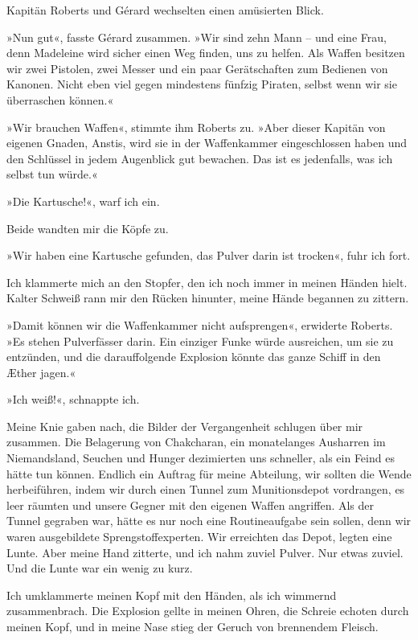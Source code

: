 Kapitän Roberts und Gérard wechselten einen amüsierten Blick.

»Nun gut«, fasste Gérard zusammen. »Wir sind zehn Mann – und eine
Frau, denn Madeleine wird sicher einen Weg finden, uns zu helfen.
Als Waffen besitzen wir zwei Pistolen, zwei Messer und ein paar
Gerätschaften zum Bedienen von Kanonen. Nicht eben viel gegen
mindestens fünfzig Piraten, selbst wenn wir sie überraschen
können.«

»Wir brauchen Waffen«, stimmte ihm Roberts zu. »Aber dieser Kapitän
von eigenen Gnaden, Anstis, wird sie in der Waffenkammer
eingeschlossen haben und den Schlüssel in jedem Augenblick gut
bewachen. Das ist es jedenfalls, was ich selbst tun würde.«

»Die Kartusche!«, warf ich ein.

Beide wandten mir die Köpfe zu.

»Wir haben eine Kartusche gefunden, das Pulver darin ist trocken«,
fuhr ich fort.

Ich klammerte mich an den Stopfer, den ich noch immer in meinen
Händen hielt. Kalter Schweiß rann mir den Rücken hinunter, meine
Hände begannen zu zittern.

»Damit können wir die Waffenkammer nicht aufsprengen«, erwiderte
Roberts. »Es stehen Pulverfässer darin. Ein einziger Funke würde
ausreichen, um sie zu entzünden, und die darauffolgende Explosion
könnte das ganze Schiff in den Æther jagen.«

»Ich weiß!«, schnappte ich.

\bigpar

Meine Knie gaben nach, die Bilder der Vergangenheit schlugen über
mir zusammen. Die Belagerung von Chakcharan, ein monatelanges
Ausharren im Niemandsland, Seuchen und Hunger dezimierten uns
schneller, als ein Feind es hätte tun können. Endlich ein Auftrag
für meine Abteilung, wir sollten die Wende herbeiführen, indem wir
durch einen Tunnel zum Munitionsdepot vordrangen, es leer räumten
und unsere Gegner mit den eigenen Waffen angriffen. Als der Tunnel
gegraben war, hätte es nur noch eine Routineaufgabe sein sollen,
denn wir waren ausgebildete Sprengstoffexperten. Wir erreichten das
Depot, legten eine Lunte. Aber meine Hand zitterte, und ich nahm
zuviel Pulver. Nur etwas zuviel. Und die Lunte war ein wenig zu
kurz.

Ich umklammerte meinen Kopf mit den Händen, als ich wimmernd
zusammenbrach. Die Explosion gellte in meinen Ohren, die Schreie
echoten durch meinen Kopf, und in meine Nase stieg der Geruch von
brennendem Fleisch.

